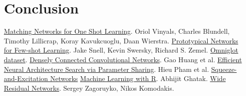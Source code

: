 \documentclass[runningheads,a4paper]{llncs}
\begin{document}
\section{Conclusion}

\begin{thebibliography}{4}
     \href{https://arxiv.org/abs/1606.04080}{Matching Networks for One Shot Learning}. Oriol Vinyals, Charles Blundell, Timothy Lillicrap, Koray Kavukcuoglu, Daan Wierstra.
     \href{https://arxiv.org/abs/1703.05175}{Prototypical Networks for Few-shot Learning}. Jake Snell, Kevin Swersky, Richard S. Zemel.
     \href{https://github.com/brendenlake/omniglot}{Omniglot dataset}.
     \href{https://arxiv.org/pdf/1608.06993.pdf}{Densely Connected Convolutional Networks}. Gao Huang et al.
     \href{https://arxiv.org/pdf/1802.03268.pdf}{Efficient Neural Architecture Search via Parameter Sharing}. Hieu Pham et al.
     \href{https://arxiv.org/pdf/1709.01507.pdf}{Squeeze-and-Excitation Networks}
     \href{https://books.google.com.ar/books?id=rERADwAAQBAJ&pg=PA64&lpg=PA64&dq=Variance+is+the+algorithm\%E2\%80\%99s+tendency+to+learn+random+things+irrespective+of+the+real+signal+by+fitting+highly+flexible+models+that+follow+the+error&source=bl&ots=raekkRHUoA&sig=ACfU3U0m3wuVS6hW9WDDsq4SGP8rSDK6Fg&hl=es-419&sa=X&ved=2ahUKEwjw8Z73q4rjAhVvD7kGHa4jDnwQ6AEwBXoECAkQAQ#v=onepage&q&f=false}{Machine Learning with R}. Abhijit Ghatak.
    \href{https://arxiv.org/pdf/1605.07146.pdf}{Wide Residual Networks}. Sergey Zagoruyko, Nikos Komodakis.
\end{thebibliography}
\end{document}
